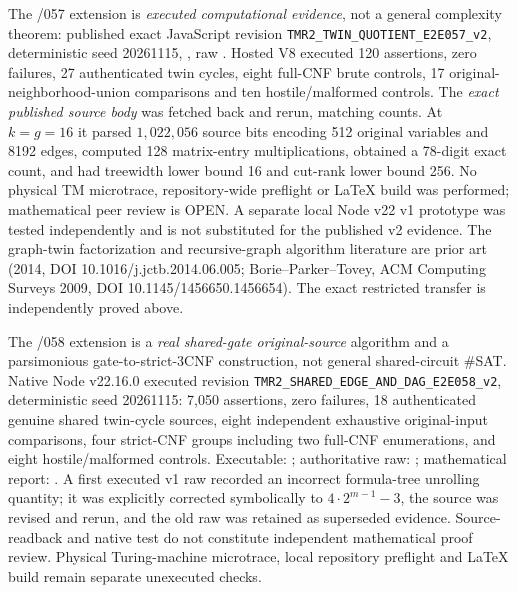 \documentclass[11pt]{article}
\begin{document}
The /057 extension is \emph{executed computational evidence}, not a general complexity theorem: published exact JavaScript revision \texttt{TMR2\_TWIN\_QUOTIENT\_E2E057\_v2}, deterministic seed 20261115, , raw . Hosted V8 executed 120 assertions, zero failures, 27 authenticated twin cycles, eight full-CNF brute controls, 17 original-neighborhood-union comparisons and ten hostile/malformed controls. The \emph{exact published source body} was fetched back and rerun, matching counts. At $k=g=16$ it parsed $1{,}022{,}056$ source bits encoding 512 original variables and 8192 edges, computed 128 matrix-entry multiplications, obtained a 78-digit exact count, and had treewidth lower bound 16 and cut-rank lower bound 256. No physical TM microtrace, repository-wide preflight or LaTeX build was performed; mathematical peer review is OPEN. A separate local Node v22 v1 prototype was tested independently and is not substituted for the published v2 evidence. The graph-twin factorization and recursive-graph algorithm literature are prior art (2014, DOI 10.1016/j.jctb.2014.06.005; Borie--Parker--Tovey, ACM Computing Surveys 2009, DOI 10.1145/1456650.1456654). The exact restricted transfer is independently proved above.


The /058 extension is a \emph{real shared-gate original-source} algorithm and a parsimonious gate-to-strict-3CNF construction, not general shared-circuit #SAT. Native Node v22.16.0 executed revision \texttt{TMR2\_SHARED\_EDGE\_AND\_DAG\_E2E058\_v2}, deterministic seed 20261115: 7,050 assertions, zero failures, 18 authenticated genuine shared twin-cycle sources, eight independent exhaustive original-input comparisons, four strict-CNF groups including two full-CNF enumerations, and eight hostile/malformed controls. Executable: ; authoritative raw: ; mathematical report: . A first executed v1 raw recorded an incorrect formula-tree unrolling quantity; it was explicitly corrected symbolically to $4\cdot2^{m-1}-3$, the source was revised and rerun, and the old raw was retained as superseded evidence. Source-readback and native test do not constitute independent mathematical proof review. Physical Turing-machine microtrace, local repository preflight and LaTeX build remain separate unexecuted checks.
\end{document}
